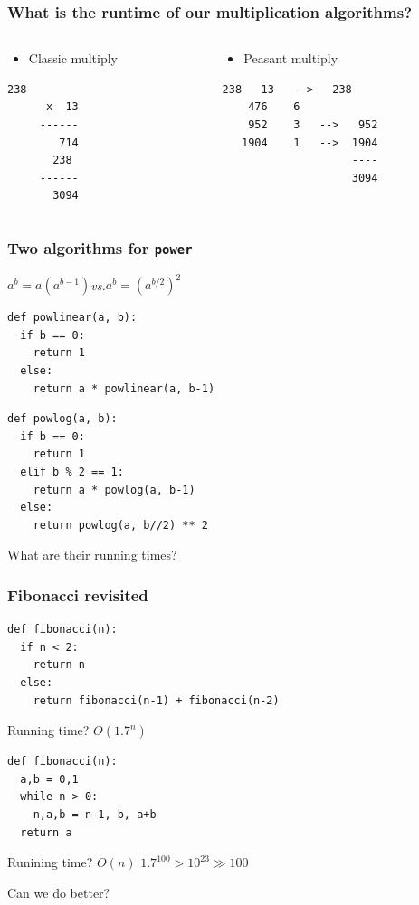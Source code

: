 \documentclass{beamer}
\newcommand{\bi}{\begin{itemize}}
\newcommand{\li}{\item}
\newcommand{\ei}{\end{itemize}}
\newcommand{\bfr}[1]{\begin{frame}[fragile]\frametitle{{ #1 }}}
\newcommand{\cola}{\begin{columns}\begin{column}{0.5\textwidth}}
\newcommand{\colb}{\end{column}\begin{column}{0.5\textwidth}}
\newcommand{\colc}{\end{column}\end{columns}}
\begin{document}
\bfr{What is the runtime of our multiplication algorithms?}
\cola
\bi\li Classic multiply\ei
\begin{Verbatim}[frame=single]
        238
      x  13
     ------
        714      
       238 
     ------
       3094
\end{Verbatim}

\colb
\bi \li Peasant multiply \ei
\begin{Verbatim}[frame=single]
    238   13   -->   238
    476    6
    952    3   -->   952
   1904    1   -->  1904
                    ----
                    3094
\end{Verbatim}                   
\colc

\end{frame}

\bfr{Two algorithms for {\tt power}}

$a^b = a(a^{b-1})$\hfill {\em vs.}\hfill $a^b = (a^{b/2})^2$
\begin{lstlisting}
def powlinear(a, b):
  if b == 0:
    return 1
  else:
    return a * powlinear(a, b-1)
\end{lstlisting}

\begin{lstlisting}
def powlog(a, b):
  if b == 0:
    return 1
  elif b % 2 == 1:
    return a * powlog(a, b-1)
  else:
    return powlog(a, b//2) ** 2
\end{lstlisting}

What are their running times?
\end{frame}

\bfr{Fibonacci revisited}
\begin{lstlisting}
def fibonacci(n):
  if n < 2:
    return n
  else:
    return fibonacci(n-1) + fibonacci(n-2)
\end{lstlisting}
Running time? \pause\hfill
\(O(1.7^n)\)\hfill ~
\begin{lstlisting}
def fibonacci(n):
  a,b = 0,1
  while n > 0:
    n,a,b = n-1, b, a+b
  return a
\end{lstlisting}
Runining time? \pause\hfill
\(O(n)\)
\pause
\hfill
\( 1.7^{100} > 10^{23} \gg 100 \)

\pause
Can we do better?

\end{frame}
\end{document}
